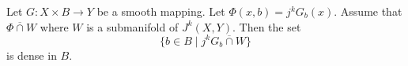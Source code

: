 Let $G: X \times B \to Y$ be a smooth mapping. Let $\Phi(x, b) = j^{k} G_{b}(x)$. Assume that $\Phi \mathrel{\overline{\cap}} W$ where $W$ is a submanifold of $J^{k}(X, Y)$. Then the set
$$\{b \in B \mid j^{k} G_{b} \mathrel{\overline{\cap}} W\}$$
is dense in $B$.
